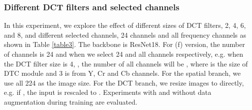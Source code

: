 \documentclass[10pt, conference, compsocconf]{IEEEtran}
\begin{document}
\subsubsection{Different DCT filters and selected channels}
In this experiment, we explore the effect of different sizes of DCT filters, 2, 4, 6, and 8, and different selected channels, 24 channels and all frequency channels as shown in Table \ref{table3}. The backbone is ResNet18. For (f) version, the number of channels is 24 and  when we select 24 and all channels respectively, e.g. when the DCT filter size is 4, , the number of all channels will be , where  is the size of DTC module and 3 is from Y, Cr and Cb channels. For the spatial branch, we use all 224 as the image size. For the DCT branch, we resize images to  directly, e.g. if , the input is rescaled to . Experiments with and without data augmentation during training are evaluated.
\end{document}

